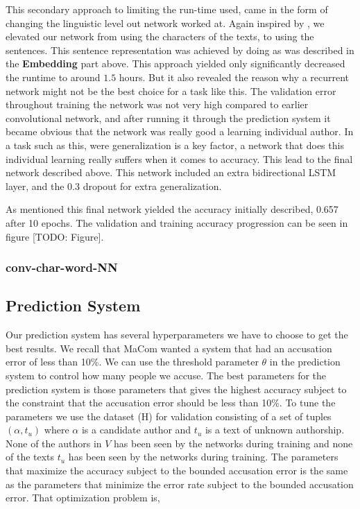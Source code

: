 This secondary approach to limiting the run-time used, came in the form
of changing the linguistic level out network worked at. Again inspired by
\cite{qian:2018}, we elevated our network from using the characters of the
texts, to using the sentences. This sentence representation was achieved by
doing as was described in the \textbf{Embedding} part above. This approach
yielded only significantly decreased the runtime to around $1.5$ hours. But it
also revealed the reason why a recurrent network might not be the best choice
for a task like this. The validation error throughout training the network was
not very high compared to earlier convolutional network, and after running it
through the prediction system it became obvious that the network was really good
a learning individual author. In a task such as this, were generalization is a
key factor, a network that does this individual learning really suffers when it
comes to accuracy. This lead to the final network described above. This network
included an extra bidirectional \gls{LSTM} layer, and the 0.3 dropout for extra
generalization.

As mentioned this final network yielded the accuracy initially described,
0.657 after 10 epochs. The validation and training accuracy progression can be
seen in figure [TODO: Figure].

\subsubsection{\glsdesc{conv-char-word-NN}}
\label{subsubsec:conv_char_word_nn}

\subsection{Prediction System}

Our prediction system has several hyperparameters we have to choose to get
the best results. We recall that MaCom wanted a system that had an accusation
error of less than 10\%. We can use the threshold parameter $\theta$ in the
prediction system to control how many people we accuse. The best parameters
for the prediction system is those parameters that gives the highest accuracy
subject to the constraint that the accusation error should be less than 10\%. To
tune the parameters we use the dataset (H) for validation consisting of a set of
tuples $(\alpha, t_u)$ where $\alpha$ is a candidate author and $t_u$ is a text
of unknown authorship. None of the authors in $V$ has been seen by the networks
during training and none of the texts $t_u$ has been seen by the networks during
training. The parameters that maximize the accuracy subject to the bounded
accusation error is the same as the parameters that minimize the error rate
subject to the bounded accusation error. That optimization problem is,

